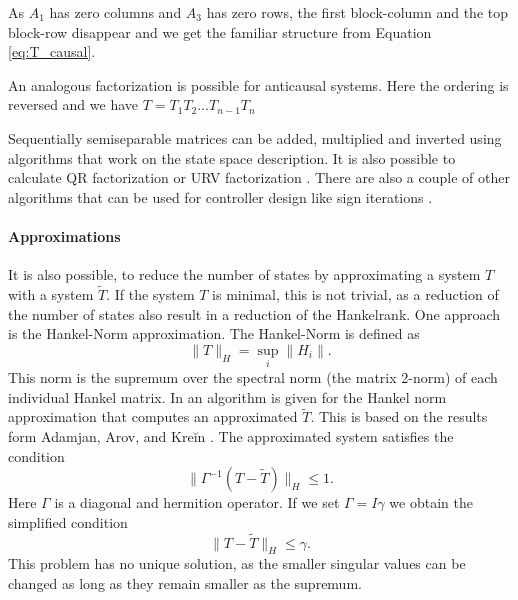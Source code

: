\documentclass[numbers=noenddot,doctype=mastersthesis,BCOR=15mm,biblatex]{ldvbook}%
\newcommand{\eye}{I} %
\begin{document}
As $A_1$ has zero columns and $A_3$ has zero rows, the first block-column and the top block-row disappear and we get the familiar structure from Equation\,\ref{eq:T_causal}.

An analogous factorization is possible for anticausal systems.
Here the ordering is reversed and we have $T = T_1 T_2 \dots T_{n-1} T_{n}$

Sequentially semiseparable matrices can be added, multiplied and inverted using algorithms that work on the state space description.
It is also possible to calculate QR factorization \cite{chandrasekaran_fast_2002,tong_blind_2003} or URV factorization \cite{chandrasekaran_fast_2005}. 
There are also a couple of other algorithms that can be used for controller design like sign iterations \cite{rice_efficient_2010}.

\paragraph{Approximations}
It is also possible, to reduce the number of states by approximating a system $T$ with a system $\tilde{T}$.
If the system $T$ is minimal, this is not trivial, as a reduction of the number of states also result in a reduction of the Hankelrank.
One approach is the Hankel-Norm approximation.
The Hankel-Norm is defined as
\begin{equation}
	\|T\|_H = \sup_{i}\|H_i\|.
\end{equation}
This norm is the supremum over the spectral norm (the matrix 2-norm) of each individual Hankel matrix.
In \cite{dewilde_time-varying_1998} an algorithm is given for the Hankel norm approximation that computes an approximated $\tilde{T}$.  
This is based on the results form Adamjan, Arov, and Kreĭn \cite{adamjan_analytic_1971}.
The approximated system satisfies the condition
\begin{equation}
	\| \Gamma^{-1}(T-\tilde{T})\|_H \leq 1.
\end{equation}
Here $\Gamma$ is a diagonal and hermition operator. 
If we set $\Gamma = \eye\gamma$ we obtain the simplified condition
\begin{equation}
	\|T-\tilde{T}\|_H \leq \gamma.
\end{equation}
This problem has no unique solution, as the smaller singular values can be changed as long as they remain smaller as the supremum.
\end{document}
